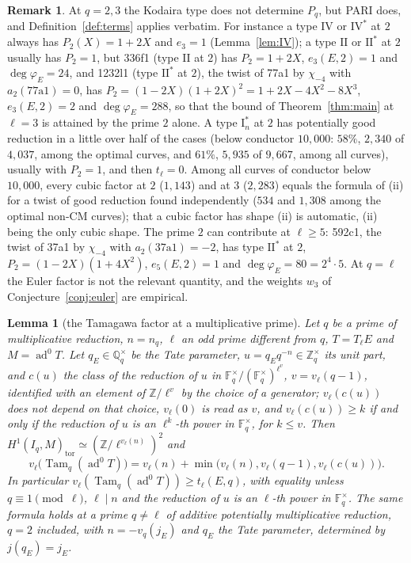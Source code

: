 \documentclass[11pt]{amsart}
\newtheorem{lemma}[theorem]{Lemma}
\theoremstyle{definition}
\newtheorem{remark}[theorem]{Remark}
\newcommand{\Q}{\mathbb{Q}}
\newcommand{\Z}{\mathbb{Z}}
\newcommand{\F}{\mathbb{F}}
\newcommand{\degphi}{\deg\varphi_E}
\newcommand{\ad}{\operatorname{ad}^0}
\newcommand{\Tam}{\operatorname{Tam}}
\begin{document}
\begin{remark}\label{rem:wild}
At $q=2,3$ the Kodaira type does not determine $P_q$, but PARI does, and Definition~\ref{def:terms} applies verbatim. For instance a type $\mathrm{IV}$ or $\mathrm{IV}^*$ at $2$ always has $P_2(X)=1+2X$ and $e_3=1$ (Lemma~\ref{lem:IV}); a type $\mathrm{II}$ or $\mathrm{II}^*$ at $2$ usually has $P_2=1$, but 336f1 (type $\mathrm{II}$ at $2$) has $P_2=1+2X$, $e_3(E,2)=1$ and $\degphi=24$, and 1232l1 (type $\mathrm{II}^*$ at $2$), the twist of 77a1 by $\chi_{-4}$ with $a_2(\text{77a1})=0$, has $P_2=(1-2X)(1+2X)^2=1+2X-4X^2-8X^3$, $e_3(E,2)=2$ and $\degphi=288$, so that the bound of Theorem~\ref{thm:main} at $\ell=3$ is attained by the prime $2$ alone. A type $\mathrm{I}_n^*$ at $2$ has potentially good reduction in a little over half of the cases (below conductor $10{,}000$: $58\%$, $2{,}340$ of $4{,}037$, among the optimal curves, and $61\%$, $5{,}935$ of $9{,}667$, among all curves), usually with $P_2=1$, and then $t_\ell=0$. Among all curves of conductor below $10{,}000$, every cubic factor at $2$ ($1{,}143$) and at $3$ ($2{,}283$) equals the formula of (ii) for a twist of good reduction found independently ($534$ and $1{,}308$ among the optimal non-CM curves); that a cubic factor has shape (ii) is automatic, (ii) being the only cubic shape. The prime $2$ can contribute at $\ell\ge5$: 592c1, the twist of 37a1 by $\chi_{-4}$ with $a_2(\text{37a1})=-2$, has type $\mathrm{II}^*$ at $2$, $P_2=(1-2X)(1+4X^2)$, $e_5(E,2)=1$ and $\degphi=80=2^4\cdot5$. At $q=\ell$ the Euler factor is not the relevant quantity, and the weights $w_3$ of Conjecture~\ref{conj:euler} are empirical.
\end{remark}

\begin{lemma}[the Tamagawa factor at a multiplicative prime]\label{lem:tamfactor}
Let $q$ be a prime of multiplicative reduction, $n=n_q$, $\ell$ an odd prime different from $q$, $T=T_\ell E$ and $M=\ad T$. Let $q_E\in\Q_q^\times$ be the Tate parameter, $u=q_Eq^{-n}\in\Z_q^\times$ its unit part, and $c(u)$ the class of the reduction of $u$ in $\F_q^\times/(\F_q^\times)^{\ell^{v}}$, $v=v_\ell(q-1)$, identified with an element of $\Z/\ell^{v}$ by the choice of a generator; $v_\ell(c(u))$ does not depend on that choice, $v_\ell(0)$ is read as $v$, and $v_\ell(c(u))\ge k$ if and only if the reduction of $u$ is an $\ell^k$-th power in $\F_q^\times$, for $k\le v$. Then $H^1(I_q,M)_{\mathrm{tor}}\simeq(\Z/\ell^{v_\ell(n)})^2$ and
\[
v_\ell\bigl(\Tam_q(\ad T)\bigr)=v_\ell(n)+\min\bigl(v_\ell(n),v_\ell(q-1),v_\ell(c(u))\bigr).
\]
In particular $v_\ell(\Tam_q(\ad T))\ge t_\ell(E,q)$, with equality unless $q\equiv1\pmod\ell$, $\ell\mid n$ and the reduction of $u$ is an $\ell$-th power in $\F_q^\times$. The same formula holds at a prime $q\ne\ell$ of additive potentially multiplicative reduction, $q=2$ included, with $n=-v_q(j_E)$ and $q_E$ the Tate parameter, determined by $j(q_E)=j_E$.
\end{lemma}
\end{document}
